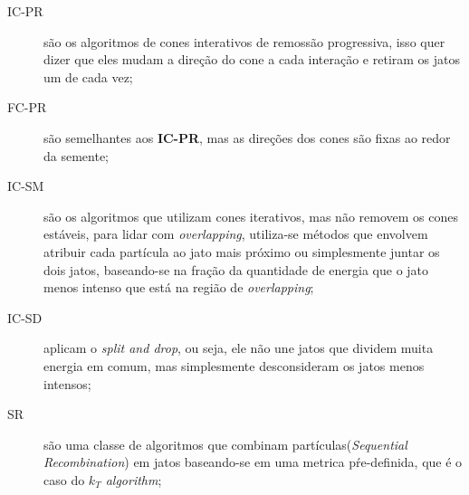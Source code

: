\begin{description}
 \item[IC-PR] são os algoritmos de cones interativos de remossão progressiva, isso
 quer dizer que eles mudam a direção do cone a cada interação e retiram os jatos um de
 cada vez;
 \item[FC-PR] são semelhantes aos {\bf IC-PR}, mas as direções dos cones são fixas ao redor
 da semente;
 \item[IC-SM] são os algoritmos que utilizam cones iterativos, mas não removem os cones
 estáveis, para lidar com \emph{overlapping}, utiliza-se métodos que envolvem atribuir cada
 partícula ao jato mais próximo ou simplesmente juntar os dois jatos, baseando-se na fração
 da quantidade de energia que o jato menos intenso que está na região de \emph{overlapping};
 \item[IC-SD] aplicam o \emph{split and drop}, ou seja, ele não une jatos que dividem muita
 energia em comum, mas simplesmente desconsideram os jatos menos intensos;
 \item[SR] são uma classe de algoritmos que combinam partículas({\it Sequential Recombination}) em jatos baseando-se
 em uma metrica pŕe-definida, que é o caso do {\it $k_T$ algorithm};
\end{description}


